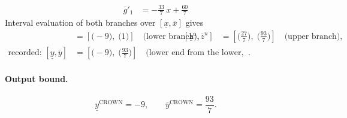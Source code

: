 \documentclass[11pt]{article}
\begin{document}
\begin{align*}
\overline{g}'_{1} &= -\frac{33}{7}\,x + \frac{60}{7}
\end{align*}
Interval evaluation of both branches over $[\underline{x}, \overline{x}]$ gives
\begin{align*}
[\underline{z}^{\ell}, \overline{z}^{\ell}] &= [\bigl(-9\bigr),\; \bigl(1\bigr)] \quad\text{(lower branch)}, & [\underline{z}^{u}, \overline{z}^{u}] &= [\bigl(\frac{27}{7}\bigr),\; \bigl(\frac{93}{7}\bigr)] \quad\text{(upper branch)}, \\
\text{recorded: } [\underline{y}, \overline{y}] &= [\bigl(-9\bigr),\; \bigl(\frac{93}{7}\bigr)] \quad\text{(lower end from the lower, upper end from the upper branch)}.
\end{align*}
\paragraph{Output bound.}
\begin{equation*}
\underline{y}^{\text{CROWN}} = -9, \qquad \overline{y}^{\text{CROWN}} = \frac{93}{7}.
\end{equation*}
\end{document}
